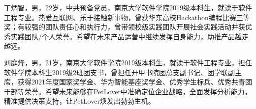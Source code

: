 \documentclass[a4paper]{ctexart}
\begin{document}
丁炳智，男，22岁，中共预备党员，南京大学软件学院2019级本科生，就读于软件工程专业。热爱互联网、乐于接触新事物，曾获华东高校Hackathon编程比赛三等奖；有较强的团队责任心和执行力，曾带领校级实践团队开展社会实践活动并获优秀实践团队/个人荣誉。希望在未来产品运营中继续发挥自身能力，助推产品越走越远。

刘庭烽，男，21岁，南京大学软件学院2019级本科生，就读于软件工程专业，担任软件学院本科生2019级2班团支书，曾担任开甲书院团总支副书记、团学联副主席，获得2021年度国家奖学金、华为智能基座奖学金、优秀学生标兵、优秀共青团干部等荣誉。希望未来能够在PetLover中准确定位企业战略，全面发挥分析能力，精准提供决策支持，让PetLover焕发出勃勃生机。
\end{document}
